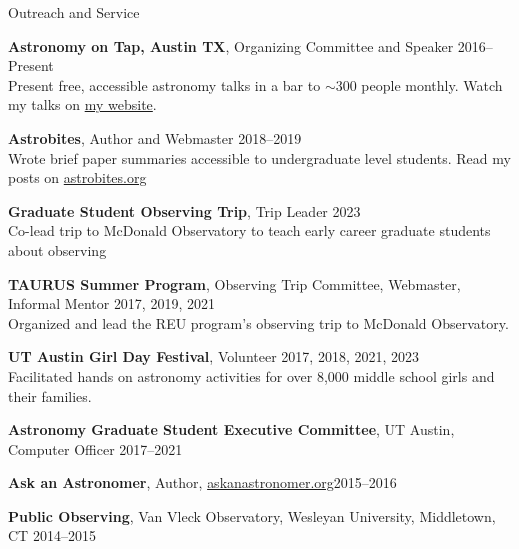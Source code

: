 \documentclass{resume} %
\begin{document}

\begin{rSection}{Outreach and Service} \itemsep -5pt

    {\bf Astronomy on Tap, Austin TX}, Organizing Committee and Speaker \hfill {2016--Present}\\Present free, accessible astronomy talks in a bar to $\sim300$ people monthly. Watch my talks on \href{https://smfactor.github.io/aboutme/}{my website}.

    {\bf Astrobites}, Author and Webmaster \hfill {2018--2019}\\Wrote brief paper summaries accessible to undergraduate level students. Read my posts on \href{http://astrobites.org/author/sfactor/}{astrobites.org}
    
    {\bf Graduate Student Observing Trip}, Trip Leader \hfill {2023}\\Co-lead trip to McDonald Observatory to teach early career graduate students about observing
    
    {\bf TAURUS Summer Program}, Observing Trip Committee, Webmaster, Informal Mentor \hfill {2017, 2019, 2021}\\Organized and lead the REU program's observing trip to McDonald Observatory.
    
    {\bf UT Austin Girl Day Festival}, Volunteer \hfill {2017, 2018, 2021, 2023}\\Facilitated hands on astronomy activities for over 8,000 middle school girls and their families.
    
    {\bf Astronomy Graduate Student Executive Committee}, UT Austin, Computer Officer \hfill{2017--2021}

    {\bf Ask an Astronomer}, Author, \href{http://askanastronomer.org/byauthor/?author=Sam+Factor}{askanastronomer.org}\hfill {2015--2016}%

    {\bf Public Observing}, Van Vleck Observatory, Wesleyan University, Middletown, CT \hfill {2014--2015}%
\vspace{-5pt}    
\end{rSection}

\end{document}
